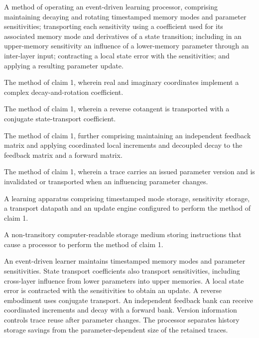 \documentclass[pct]{sm-patent}
\begin{document}
\begin{patentclaims}

\item A method of operating an event-driven learning processor, comprising maintaining decaying and rotating timestamped memory modes and parameter sensitivities; transporting each sensitivity using a coefficient used for its associated memory mode and derivatives of a state transition; including in an upper-memory sensitivity an influence of a lower-memory parameter through an inter-layer input; contracting a local state error with the sensitivities; and applying a resulting parameter update.

\item The method of claim 1, wherein real and imaginary coordinates implement a complex decay-and-rotation coefficient.

\item The method of claim 1, wherein a reverse cotangent is transported with a conjugate state-transport coefficient.

\item The method of claim 1, further comprising maintaining an independent feedback matrix and applying coordinated local increments and decoupled decay to the feedback matrix and a forward matrix.

\item The method of claim 1, wherein a trace carries an issued parameter version and is invalidated or transported when an influencing parameter changes.

\item A learning apparatus comprising timestamped mode storage, sensitivity storage, a transport datapath and an update engine configured to perform the method of claim 1.

\item A non-transitory computer-readable storage medium storing instructions that cause a processor to perform the method of claim 1.

\end{patentclaims}

\abstractstart

An event-driven learner maintains timestamped memory modes and parameter sensitivities. State transport coefficients also transport sensitivities, including cross-layer influence from lower parameters into upper memories. A local state error is contracted with the sensitivities to obtain an update. A reverse embodiment uses conjugate transport. An independent feedback bank can receive coordinated increments and decay with a forward bank. Version information controls trace reuse after parameter changes. The processor separates history storage savings from the parameter-dependent size of the retained traces.
\end{document}
